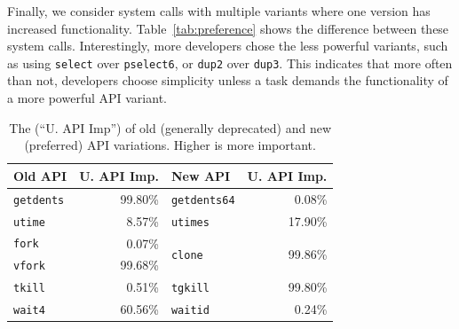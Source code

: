 Finally, we consider system calls with multiple variants
where one version has increased functionality.
Table~\ref{tab:preference} shows the difference %
between these system calls.
Interestingly, more developers chose the less powerful variants,
such as using {\tt select} over {\tt pselect6}, or {\tt dup2} over {\tt dup3}.
This indicates that more often than not, developers choose simplicity 
unless a task demands the functionality of a more powerful API variant.

\begin{table}[t!b!]
  \footnotesize
  \centering
  \begin{tabular}{m{0.75in}rm{0.75in}r}
\toprule
\textbf{Old API} & \textbf{U. API Imp.} & \textbf{New API} & \textbf{U. API Imp.}\\
\midrule
{\tt getdents} & 99.80\% & {\tt getdents64} & 0.08\% \\
\addlinespace
{\tt utime} & 8.57\% & {\tt utimes} & 17.90\% \\
\addlinespace
{\tt fork} & 0.07\% & \multirow{2}{*}{\tt clone} & \multirow{2}{*}{99.86\%} \\ 
{\tt vfork} & 99.68\% & & \\
\addlinespace
{\tt tkill} & 0.51\% & {\tt tgkill} & 99.80\% \\
\addlinespace
{\tt wait4} & 60.56\% & {\tt waitid} & 0.24\% \\
\end{tabular}%
\caption{The \unwusagemetric{} (``U. API Imp'') of old (generally deprecated) and new (preferred) API variations. Higher is more important.}
\vspace{-0.1in}
\label{tab:old}%
\end{table}%


